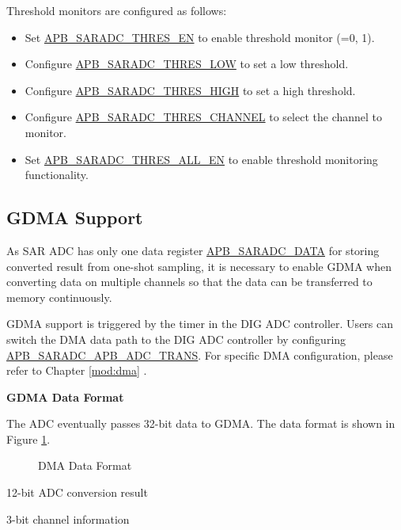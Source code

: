 \documentclass[main\_\_EN.tex]{subfiles}
\begin{document}
Threshold monitors are configured as follows:

\begin{itemize}
    \item Set \hyperref[fielddesc:APBSARADCTHRESALLEN]{APB\_SARADC\_THRES\_EN} to enable threshold monitor  (=0, 1).
    \item Configure \hyperref[fielddesc:APBSARADCTHRES1LOW]{APB\_SARADC\_THRES\_LOW} to set a low threshold.
    \item Configure \hyperref[fielddesc:APBSARADCTHRES1LOW]{APB\_SARADC\_THRES\_HIGH} to set a high threshold.
    \item Configure \hyperref[fielddesc:APBSARADCTHRES1LOW]{APB\_SARADC\_THRES\_CHANNEL} to select the channel to monitor.
    \item Set \hyperref[fielddesc:APBSARADCTHRESALLEN]{APB\_SARADC\_THRES\_ALL\_EN} to enable threshold monitoring functionality.
\end{itemize}

\subsection{GDMA Support}

As SAR ADC has only one data register \hyperref[fielddesc:APBSARADCDATA]{APB\_SARADC\_DATA} for storing converted result from one-shot sampling, it is necessary to enable GDMA when converting data on multiple channels so that the data can be transferred to memory continuously.

GDMA support is triggered by the timer in the DIG ADC controller. Users can switch the DMA data path to the DIG ADC controller by configuring \hyperref[fielddesc:APBSARADCAPBADCTRANS]{APB\_SARADC\_APB\_ADC\_TRANS}. For specific DMA configuration, please refer to Chapter \ref{mod:dma} \textit{}.

\textbf{GDMA Data Format}

The ADC eventually passes 32-bit data to GDMA. The data format is shown in Figure \ref{fig:adc-dma-data-format}.

\begin{figure}[H]
\centering
{}%
%
%
%
%
\end{figure}
\vspace{-2em}
\begin{figure}[H]
    \centering
    \caption{DMA Data Format}
    \label{fig:adc-dma-data-format}
\end{figure}
\vspace{-2em}
\begin{regdesc}\begin{reglist}
\item [data] 12-bit ADC conversion result
\item [ch\_sel] 3-bit channel information
\end{reglist}\end{regdesc}
\end{document}
